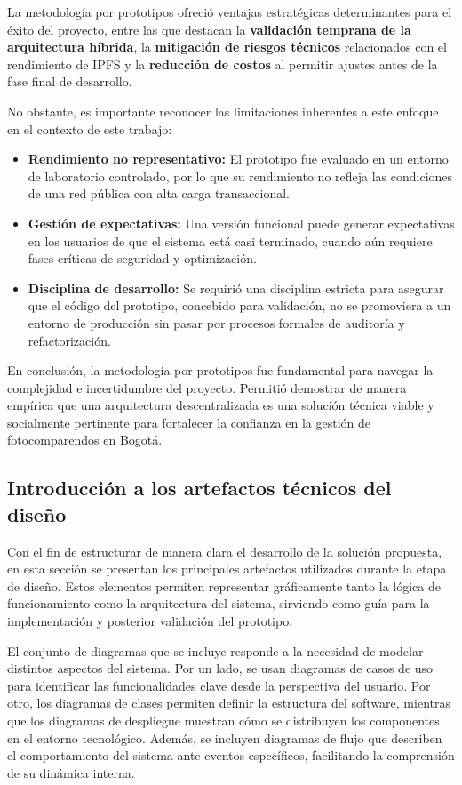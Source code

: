 La metodología por prototipos ofreció ventajas estratégicas determinantes para el éxito del proyecto, entre las que destacan la \textbf{validación temprana de la arquitectura híbrida}, la \textbf{mitigación de riesgos técnicos} relacionados con el rendimiento de IPFS y la \textbf{reducción de costos} al permitir ajustes antes de la fase final de desarrollo.

No obstante, es importante reconocer las limitaciones inherentes a este enfoque en el contexto de este trabajo:

\begin{itemize}
    \item \textbf{Rendimiento no representativo:} El prototipo fue evaluado en un entorno de laboratorio controlado, por lo que su rendimiento no refleja las condiciones de una red pública con alta carga transaccional.
    
    \item \textbf{Gestión de expectativas:} Una versión funcional puede generar expectativas en los usuarios de que el sistema está casi terminado, cuando aún requiere fases críticas de seguridad y optimización.
    
    \item \textbf{Disciplina de desarrollo:} Se requirió una disciplina estricta para asegurar que el código del prototipo, concebido para validación, no se promoviera a un entorno de producción sin pasar por procesos formales de auditoría y refactorización.
\end{itemize}

En conclusión, la metodología por prototipos fue fundamental para navegar la complejidad e incertidumbre del proyecto. Permitió demostrar de manera empírica que una arquitectura descentralizada es una solución técnica viable y socialmente pertinente para fortalecer la confianza en la gestión de fotocomparendos en Bogotá. 
\subsection{Introducción a los artefactos técnicos del diseño}
Con el fin de estructurar de manera clara el desarrollo de la solución propuesta, en esta sección se presentan los principales artefactos utilizados durante la etapa de diseño. Estos elementos permiten representar gráficamente tanto la lógica de funcionamiento como la arquitectura del sistema, sirviendo como guía para la implementación y posterior validación del prototipo.

El conjunto de diagramas que se incluye responde a la necesidad de modelar distintos aspectos del sistema. Por un lado, se usan diagramas de casos de uso para identificar las funcionalidades clave desde la perspectiva del usuario. Por otro, los diagramas de clases permiten definir la estructura del software, mientras que los diagramas de despliegue muestran cómo se distribuyen los componentes en el entorno tecnológico. Además, se incluyen diagramas de flujo que describen el comportamiento del sistema ante eventos específicos, facilitando la comprensión de su dinámica interna.

